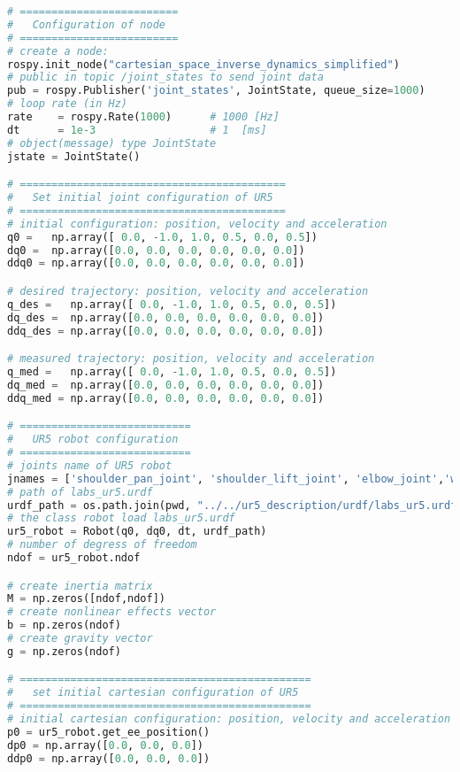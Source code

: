 \begin{lstlisting}[language=Python, caption={Move the ur5 robot end-effector using the Cartesian space inverse dynamics and null space projection, \eqref{eq:cartesian_idyn_N_simplified} to follows the Cartesian sinusoidal reference of activity \ref{subsec:generate_sinusoidal_reference}.}, label={lst:cartesian_idyn_N_simplified}]
# =========================
#   Configuration of node
# =========================
# create a node: 
rospy.init_node("cartesian_space_inverse_dynamics_simplified")
# public in topic /joint_states	to send joint data	
pub = rospy.Publisher('joint_states', JointState, queue_size=1000)
# loop rate (in Hz)
rate 	= rospy.Rate(1000)		# 1000 [Hz]
dt 		= 1e-3					# 1  [ms]
# object(message) type JointState
jstate = JointState()

# ==========================================
#   Set initial joint configuration of UR5
# ==========================================
# initial configuration: position, velocity and acceleration 
q0 =   np.array([ 0.0, -1.0, 1.0, 0.5, 0.0, 0.5])
dq0 =  np.array([0.0, 0.0, 0.0, 0.0, 0.0, 0.0]) 
ddq0 = np.array([0.0, 0.0, 0.0, 0.0, 0.0, 0.0]) 

# desired trajectory: position, velocity and acceleration
q_des =   np.array([ 0.0, -1.0, 1.0, 0.5, 0.0, 0.5])
dq_des =  np.array([0.0, 0.0, 0.0, 0.0, 0.0, 0.0]) 
ddq_des = np.array([0.0, 0.0, 0.0, 0.0, 0.0, 0.0]) 

# measured trajectory: position, velocity and acceleration
q_med =   np.array([ 0.0, -1.0, 1.0, 0.5, 0.0, 0.5])
dq_med =  np.array([0.0, 0.0, 0.0, 0.0, 0.0, 0.0]) 
ddq_med = np.array([0.0, 0.0, 0.0, 0.0, 0.0, 0.0]) 

# ===========================
#   UR5 robot configuration
# ===========================
# joints name of UR5 robot
jnames = ['shoulder_pan_joint', 'shoulder_lift_joint', 'elbow_joint','wrist_1_joint', 'wrist_2_joint', 'wrist_3_joint']
# path of labs_ur5.urdf
urdf_path = os.path.join(pwd, "../../ur5_description/urdf/labs_ur5.urdf")
# the class robot load labs_ur5.urdf
ur5_robot = Robot(q0, dq0, dt, urdf_path)
# number of degress of freedom
ndof = ur5_robot.ndof

# create inertia matrix 
M = np.zeros([ndof,ndof])
# create nonlinear effects vector
b = np.zeros(ndof)
# create gravity vector
g = np.zeros(ndof)

# ==============================================
#   set initial cartesian configuration of UR5
# ==============================================
# initial cartesian configuration: position, velocity and acceleration
p0 = ur5_robot.get_ee_position()
dp0 = np.array([0.0, 0.0, 0.0])
ddp0 = np.array([0.0, 0.0, 0.0])


\end{lstlisting}
